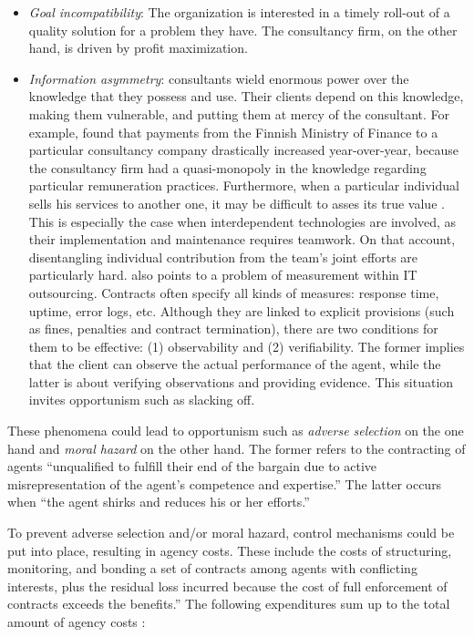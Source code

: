 \documentclass[12pt]{article}
\providecommand{\tightlist}{%
  \setlength{\itemsep}{0pt}\setlength{\parskip}{0pt}}
\begin{document}
\begin{itemize}
\tightlist
\item
  \emph{Goal incompatibility}: The organization is interested in a
  timely roll-out of a quality solution for a problem they have. The
  consultancy firm, on the other hand, is driven by profit maximization.
\item
  \emph{Information asymmetry}: consultants wield enormous power over
  the knowledge that they possess and use. Their clients depend on this
  knowledge, making them vulnerable, and putting them at mercy of the
  consultant. \citep{brien1998} For example, \citet[248-249]{ylonen2019}
  found that payments from the Finnish Ministry of Finance to a
  particular consultancy company drastically increased year-over-year,
  because the consultancy firm had a quasi-monopoly in the knowledge
  regarding particular remuneration practices. Furthermore, when a
  particular individual sells his services to another one, it may be
  difficult to asses its true value \citep[ 134-135]{ouchi1980}. This is
  especially the case when interdependent technologies are involved, as
  their implementation and maintenance requires teamwork. On that
  account, disentangling individual contribution from the team's joint
  efforts are particularly hard. \citet[59]{aubert1996} also points to a
  problem of measurement within IT outsourcing. Contracts often specify
  all kinds of measures: response time, uptime, error logs, etc.
  Although they are linked to explicit provisions (such as fines,
  penalties and contract termination), there are two conditions for them
  to be effective: (1) observability and (2) verifiability. The former
  implies that the client can observe the actual performance of the
  agent, while the latter is about verifying observations and providing
  evidence. This situation invites opportunism such as slacking off.
\end{itemize}

These phenomena could lead to opportunism such as \emph{adverse
selection} on the one hand and \emph{moral hazard} on the other hand.
\citep[ 14]{rousseau1993} The former refers to the contracting of agents
``unqualified to fulfill their end of the bargain due to active
misrepresentation of the agent's competence and expertise.'' The latter
occurs when ``the agent shirks and reduces his or her efforts.''

To prevent adverse selection and/or moral hazard, control mechanisms
could be put into place, resulting in agency costs. These include the
costs of structuring, monitoring, and bonding a set of contracts among
agents with conflicting interests, plus the residual loss incurred
because the cost of full enforcement of contracts exceeds the
benefits.'' \citep[ 327]{fama1983} The following expenditures sum up to
the total amount of agency costs \citep[ 308]{jensen1976}:
\end{document}
